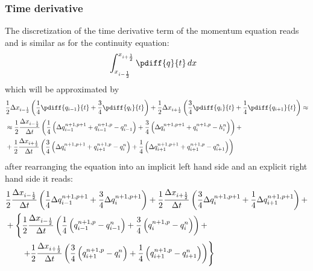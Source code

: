 \subsubsection{Time derivative}
The discretization of the time derivative term of the momentum equation reads and is similar as for the continuity equation:
\begin{align}
    & \int^{x_{i+\half}}_{x_{i-\half}} \pdiff{q}{t}\, dx
\end{align}
which will be approximated by
\begin{align}
    &\half \Delta x_{i-\half} \left( \frac{1}{4}\pdiff{q_{i-1}}{t} + \frac{3}{4}\pdiff{q_{i}}{t}  \right) +
    \half \Delta x_{i+\half} \left( \frac{3}{4}\pdiff{q_{i}}{t} + \frac{1}{4}\pdiff{q_{i+1}}{t} \right) \approx
    \nonumber \\*
    & \approx
    \half \frac{\Delta x_{i-\half}}{\Dt} \left(
    \frac{1}{4}\left(\Delta q^{n+1,p+1}_{i-1} + q^{n+1,p}_{i-1} - q^{n}_{i-1} \right) + \frac{3}{4}\left(\Delta q^{n+1,p+1}_{i} + q^{n+1,p}_{i}- h^{n}_{i}\right)
    \right) +
    \nonumber \\*
    & +
    \half \frac{\Delta x_{i+\half}}{\Dt} \left(
    \frac{3}{4}\left(\Delta q^{n+1,p+1}_{i} + q^{n+1,p}_{i+1}- q^{n}_{i}\right) +
    \frac{1}{4}\left(\Delta q^{n+1,p+1}_{i+1} + q^{n+1,p}_{i+1}- q^{n}_{i+1}\right)
    \right)
\end{align}
after rearranging the equation into an implicit left hand side and an explicit right hand side  it reads:
\begin{align}
    & \frac{1}{2} \frac{\Delta x_{i-\frac{1}{2}}}{\Delta t} \left(
    \frac{1}{4}\Delta q^{n+1,p+1}_{i-1} + \frac{3}{4}\Delta q^{n+1,p+1}_{i}
    \right) +
    \frac{1}{2} \frac{\Delta x_{i+\frac{1}{2}}}{\Delta t} \left( \frac{3}{4}\Delta q^{n+1,p+1}_{i} + \frac{1}{4}\Delta q^{n+1,p+1}_{i+1}
    \right) +
    \nonumber \\
    & + \left\{
    \frac{1}{2} \frac{\Delta x_{i-\frac{1}{2}}}{\Delta t} \left(
    \frac{1}{4}\left(q^{n+1,p}_{i-1} - q^{n}_{i-1} \right) + \frac{3}{4}\left(q^{n+1,p}_{i}- q^{n}_{i}\right)
    \right) + \right.
    \nonumber \\*
    & \qquad \left. +
    \frac{1}{2} \frac{\Delta x_{i+\frac{1}{2}}}{\Delta t} \left( \frac{3}{4}\left(q^{n+1,p}_{i+1}- q^{n}_{i}\right) + \frac{1}{4}\left(q^{n+1,p}_{i+1}- q^{n}_{i+1}\right)
    \right)\right\}
\end{align}

